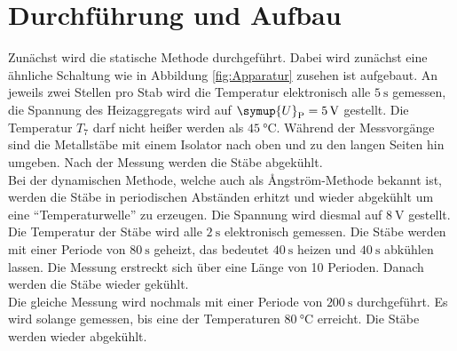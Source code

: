 \section{Durchführung und Aufbau}
\label{sec:Durchführung}
Zunächst wird die statische Methode durchgeführt.
Dabei wird zunächst eine ähnliche Schaltung wie in Abbildung \ref{fig:Apparatur} zusehen ist
aufgebaut. An jeweils zwei Stellen pro Stab wird die Temperatur elektronisch
alle $\SI{5}{\second}$ gemessen, die Spannung des Heizaggregats
wird auf $\symup{U}_\text{P} = \SI{5}{\volt}$ gestellt. Die
Temperatur $T_7$ darf nicht heißer werden als $\SI{45}{\celsius}$.
Während der Messvorgänge sind die Metallstäbe mit einem Isolator nach oben und
zu den langen Seiten hin umgeben. Nach der Messung werden die Stäbe abgekühlt.
\\
Bei der dynamischen Methode, welche auch als Ångström-Methode bekannt ist, werden
die Stäbe in periodischen Abständen erhitzt und wieder abgekühlt um eine
\enquote{Temperaturwelle} zu erzeugen.
Die Spannung wird diesmal auf $\SI{8}{\volt}$ gestellt.
Die Temperatur der Stäbe wird alle $\SI{2}{\second}$ elektronisch gemessen.
Die Stäbe werden mit einer Periode von $\SI{80}{\second}$ geheizt,
das bedeutet $\SI{40}{\second}$ heizen und $\SI{40}{\second}$
abkühlen lassen. Die Messung erstreckt sich über eine Länge von 10 Perioden.
Danach werden die Stäbe wieder gekühlt.
\\
Die gleiche Messung wird nochmals mit einer Periode von $\SI{200}{\second}$
durchgeführt. Es wird solange gemessen, bis eine der Temperaturen
$\SI{80}{\celsius}$ erreicht.
Die Stäbe werden wieder abgekühlt.

